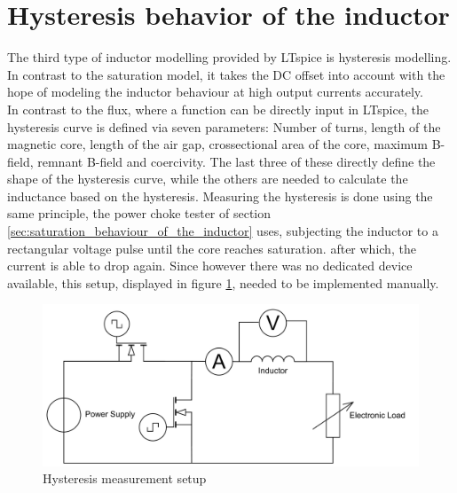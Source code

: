 \newpage
\section{Hysteresis behavior of the inductor} \label{sec:hysteresis_behaviour_of_the_inductor}
The third type of inductor modelling provided by LTspice is hysteresis modelling. In contrast to the saturation model, it takes the \ac{DC} offset into account with the hope of modeling the inductor behaviour at high output currents accurately.\\
In contrast to the flux, where a function can be directly input in LTspice, the hysteresis curve is defined via seven parameters: Number of turns, length of the magnetic core, length of the air gap, crossectional area of the core, maximum B-field, remnant B-field and coercivity. The last three of these directly define the shape of the hysteresis curve, while the others are needed to calculate the inductance based on the hysteresis. Measuring the hysteresis is done using the same principle, the power choke tester of section \ref{sec:saturation_behaviour_of_the_inductor} uses, subjecting the inductor to a rectangular voltage pulse until the core reaches saturation. after which, the current is able to drop again. Since however there was no dedicated device available, this setup, displayed in figure \ref{fig:hysteresis_measurement_setup}, needed to be implemented manually.\\
\begin{figure}[H]
    \centering
    \includegraphics[width=.8\linewidth]{Bilder/Kapitel3/Hysteresis_Measurement_Setup.pdf}
    \caption{Hysteresis measurement setup}
    \label{fig:hysteresis_measurement_setup}
\end{figure}
